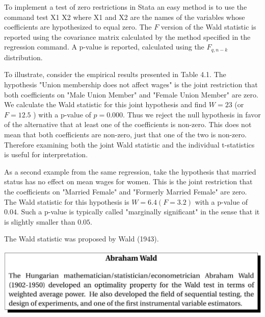 \documentclass[10pt]{article}
\begin{document}
To implement a test of zero restrictions in Stata an easy method is to use the command test X1 X2 where X1 and X2 are the names of the variables whose coefficients are hypothesized to equal zero. The $F$ version of the Wald statistic is reported using the covariance matrix calculated by the method specified in the regression command. A p-value is reported, calculated using the $F_{q, n-k}$ distribution.

To illustrate, consider the empirical results presented in Table 4.1. The hypothesis "Union membership does not affect wages" is the joint restriction that both coefficients on "Male Union Member" and "Female Union Member" are zero. We calculate the Wald statistic for this joint hypothesis and find $W=23$ (or $F=12.5$ ) with a p-value of $p=0.000$. Thus we reject the null hypothesis in favor of the alternative that at least one of the coefficients is non-zero. This does not mean that both coefficients are non-zero, just that one of the two is non-zero. Therefore examining both the joint Wald statistic and the individual t-statistics is useful for interpretation.

As a second example from the same regression, take the hypothesis that married status has no effect on mean wages for women. This is the joint restriction that the coefficients on "Married Female" and "Formerly Married Female" are zero. The Wald statistic for this hypothesis is $W=6.4(F=3.2)$ with a p-value of $0.04$. Such a p-value is typically called "marginally significant" in the sense that it is slightly smaller than $0.05$.

The Wald statistic was proposed by Wald (1943).

\includegraphics[max width=\textwidth]{2022_09_17_d22774979aa7978900adg-11}
\end{document}

